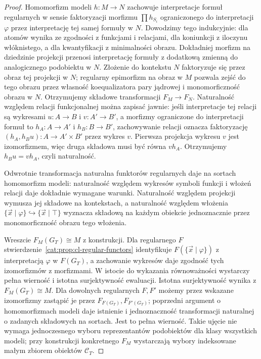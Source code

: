 \begin{proof}
Homomorfizm modeli $h:M\to N$ zachowuje interpretacje formuł regularnych w sensie faktoryzacji morfizmu $\prod h_{S_i}$ ograniczonego do interpretacji $\varphi$ przez interpretację tej samej formuły w $N$. Dowodzimy tego indukcyjnie: dla atomów wynika ze zgodności z funkcjami i relacjami, dla koniunkcji z iloczynu włóknistego, a dla kwantyfikacji z minimalności obrazu. Dokładniej morfizm na dziedzinie projekcji przenosi interpretację formuły z dodatkową zmienną do analogicznego podobiektu w $N$. Złożenie do kontekstu $N$ faktoryzuje się przez obraz tej projekcji w $N$; regularny epimorfizm na obraz w $M$ pozwala zejść do tego obrazu przez własność koequalizatora pary jądrowej i monomorficzność obrazu w $N$. Otrzymujemy składowe transformacji $F_M\to F_N$. Naturalność względem relacji funkcjonalnej można zapisać jawnie: jeśli interpretacje tej relacji są wykresami $u:A\to B$ i $v:A'\to B'$, a morfizmy ograniczone do interpretacji formuł to $h_A:A\to A'$ i $h_B:B\to B'$, zachowywanie relacji oznacza faktoryzację $(h_A,h_Bu):A\to A'\times B'$ przez wykres $v$. Pierwsza projekcja wykresu $v$ jest izomorfizmem, więc druga składowa musi być równa $vh_A$. Otrzymujemy $h_Bu=vh_A$, czyli naturalność.

Odwrotnie transformacja naturalna funktorów regularnych daje na sortach homomorfizm modeli: naturalność względem wykresów symboli funkcji i włożeń relacji daje dokładnie wymagane warunki. Naturalność względem projekcji wymusza jej składowe na kontekstach, a naturalność względem włożenia $\{\vec x\mid\varphi\}\hookrightarrow\{\vec x\mid\top\}$ wyznacza składową na każdym obiekcie jednoznacznie przez monomorficzność obrazu tego włożenia.

Wreszcie $F_M(G_T)\cong M$ z konstrukcji. Dla regularnego $F$ stwierdzenie~\ref{cat:prop:cl-regular-functors} identyfikuje $F(\{\vec x\mid\varphi\})$ z interpretacją $\varphi$ w $F(G_T)$, a zachowanie wykresów daje zgodność tych izomorfizmów z morfizmami. W istocie do wykazania równoważności wystarczy pełna wierność i istotna surjektywność ewaluacji. Istotna surjektywność wynika z $F_M(G_T)\cong M$. Dla dowolnych regularnych $F,F'$ możemy przez wskazane izomorfizmy zastąpić je przez $F_{F(G_T)},F_{F'(G_T)}$; poprzedni argument o homomorfizmach modeli daje istnienie i jednoznaczność transformacji naturalnej o zadanych składowych na sortach. Jest to pełna wierność. Takie ujęcie nie wymaga jednoczesnego wyboru reprezentantów podobiektów dla klasy wszystkich modeli; przy konstrukcji konkretnego $F_M$ wystarczają wybory indeksowane małym zbiorem obiektów $\mathcal C_T$.
\end{proof}

